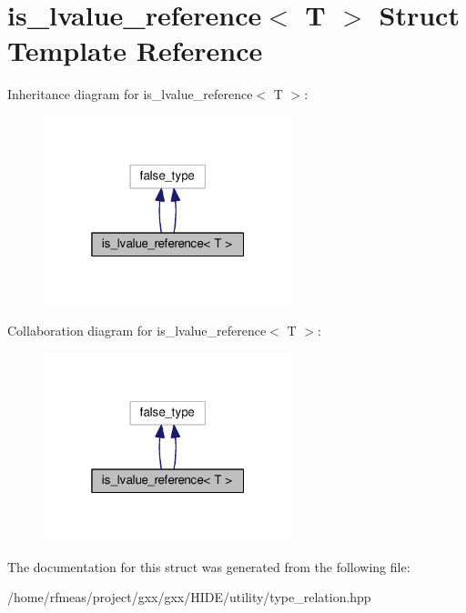\hypertarget{structis__lvalue__reference}{}\section{is\+\_\+lvalue\+\_\+reference$<$ T $>$ Struct Template Reference}
\label{structis__lvalue__reference}


Inheritance diagram for is\+\_\+lvalue\+\_\+reference$<$ T $>$\+:
\nopagebreak
\begin{figure}[H]
\begin{center}
\leavevmode
\includegraphics[width=205pt]{structis__lvalue__reference__inherit__graph}
\end{center}
\end{figure}


Collaboration diagram for is\+\_\+lvalue\+\_\+reference$<$ T $>$\+:
\nopagebreak
\begin{figure}[H]
\begin{center}
\leavevmode
\includegraphics[width=205pt]{structis__lvalue__reference__coll__graph}
\end{center}
\end{figure}


The documentation for this struct was generated from the following file\+:\begin{DoxyCompactItemize}
\item 
/home/rfmeas/project/gxx/gxx/\+H\+I\+D\+E/utility/type\+\_\+relation.\+hpp\end{DoxyCompactItemize}
